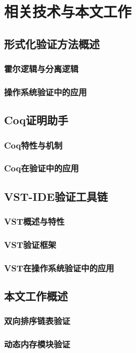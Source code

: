 \chapter{相关技术与本文工作}
\section{形式化验证方法概述}
\subsection{霍尔逻辑与分离逻辑}
\subsection{操作系统验证中的应用}
\section{Coq证明助手}
\subsection{Coq特性与机制}
\subsection{Coq在验证中的应用}
\section{VST-IDE验证工具链}
\subsection{VST概述与特性}
\subsection{VST验证框架}
\subsection{VST在操作系统验证中的应用}
\section{本文工作概述}
\subsection{双向排序链表验证}
\subsection{动态内存模块验证}